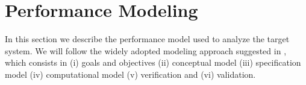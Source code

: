 \section{Performance Modeling}
\label{sec:performance-modeling}

In this section we describe the performance model used to analyze the target system. 
We will follow the widely adopted modeling approach suggested in \cite{leemis2006discrete}, which consists in (i) goals and objectives (ii) conceptual model (iii) specification model (iv) computational model (v) verification and (vi) validation.






